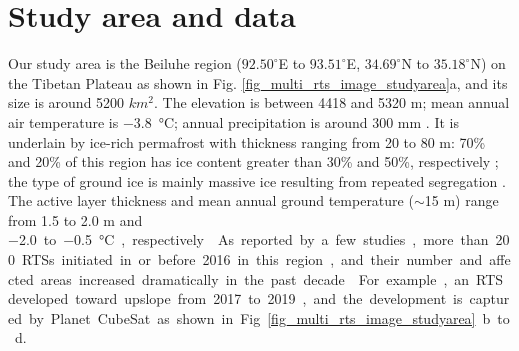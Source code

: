 \documentclass[authoryear,preprint,review,12pt]{elsarticle}
\begin{document}
\section{Study area and data}
\label{sec_studyarea_data}

Our study area is the Beiluhe region ($92.50^\circ$E to $93.51^\circ$E, $34.69^\circ$N to $35.18^\circ$N) on the Tibetan Plateau as shown in Fig. \ref{fig_multi_rts_image_studyarea}a, and its size is around 5200 $km^2$.
The elevation is between 4418 and 5320 m; mean annual air temperature is \SI{-3.8}{\celsius}; annual precipitation is around 300 mm  \citep{luo_thermokarst_2015}.
It is underlain by ice-rich permafrost with thickness ranging from 20 to 80 m: 70\% and 20\% of this region has ice content greater than 30\% and 50\%, respectively \citep{zhou_geocryology_2000, luo_thermokarst_2015}; 
the type of ground ice is mainly massive ice resulting from repeated segregation \citep{guodong1983mechanism}. 
The active layer thickness and mean annual ground temperature ($\sim$15 m) range from 1.5 to 2.0 m and \SI{-2.0} to \SI{-0.5}{\celsius}, respectively \citep{zhou_geocryology_2000, wu2010changes, luo_thermokarst_2015,  wu2015changes}. 
As reported by a few studies, more than 200 RTSs initiated in or before 2016 in this region,  and their number and affected areas increased dramatically in the past decade \citep{luo2019recent}.  
For example, an RTS developed toward upslope from 2017 to 2019, and the development is captured by Planet CubeSat as shown in Fig. \ref{fig_multi_rts_image_studyarea}b to d. 

\end{document}

